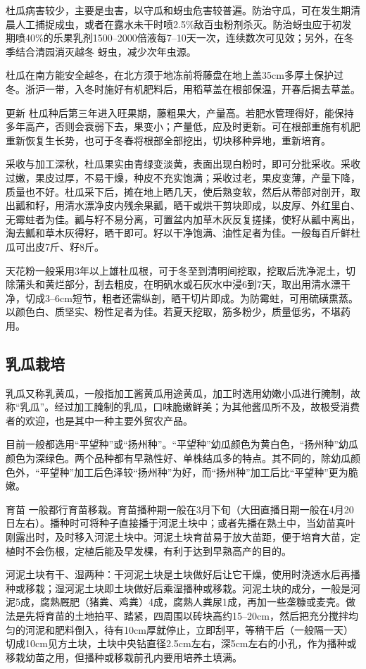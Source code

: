 \documentclass{ctexbook}
\begin{document}
杜瓜病害较少，主要是虫害，以守瓜和蚜虫危害较普遍。防治守瓜，可在发生期清晨人工捕捉成虫，或者在露水未干时喷2.5\%敌百虫粉剂杀灭。防治蚜虫应于初发期喷40\%的乐果乳剂1500--2000倍液每7--10天一次，连续数次可见效；另外，在冬季结合清园消灭越冬
蚜虫，减少次年虫源。

杜瓜在南方能安全越冬，在北方须于地冻前将藤盘在地上盖35cm多厚土保护过冬。浙沪一带，入冬时施好有机肥料后，用稻草盖在根部保温，开春后揭去草盖。

更新 杜瓜种后第三年进入旺果期，藤粗果大，产量高。若肥水管理得好，能保持多年高产，否则会衰弱下去，果变小；产量低，应及时更新。可在根部重施有机肥重新恢复生长势，也可于冬春将根部全部挖出，切块移种异地，重新培育。

采收与加工深秋，杜瓜果实由青绿变淡黄，表面出现白粉时，即可分批采收。采收过嫩，果皮过厚，不易干燥，种皮不充实饱满；采收过老，果皮变薄，产量下降，质量也不好。杜瓜采下后，摊在地上晒几天，使后熟变软，然后从蒂部对剖开，取出瓤和籽，用清水漂净皮内残余果瓤，晒干或烘干剪块即成，以皮厚、外红里白、无霉蛀者为佳。瓤与籽不易分离，可置盆内加草木灰反复搓揉，使籽从瓤中离出，淘去瓤和草木灰得籽，晒干即可。籽以干净饱满、油性足者为佳。一般每百斤鲜杜瓜可出皮7斤、籽8斤。

天花粉一般采用3年以上雄杜瓜根，可于冬至到清明间挖取，挖取后洗净泥土，切除蒲头和黄烂部分，刮去粗皮，在明矾水或石灰水中浸6到7天，取出用清水漂干净，切成3--6cm短节，粗者还需纵剖，晒干切片即成。为防霉蛀，可用硫磺熏蒸。以颜色白、质坚实、粉性足者为佳。若夏天挖取，筋多粉少，质量低劣，不堪药用。
\subsection{乳瓜栽培}
乳瓜又称乳黄瓜，一般指加工酱黄瓜用途黄瓜，加工时选用幼嫩小瓜进行腌制，故称“乳瓜”。经过加工腌制的乳瓜，口味脆嫩鲜美；为其他酱瓜所不及，故极受消费者的欢迎，也是其中一种主要外贸农产品。

目前一般都选用“平望种”或“扬州种”。“平望种”幼瓜颜色为黄白色，“扬州种”幼瓜颜色为深绿色。两个品种都有早熟性好、单株结瓜多的特点。其不同的，除幼瓜颜色外，“平望种”加工后色泽较“扬州种”为好，而“扬州种”加工后比“平望种”更为脆嫩。

育苗 一般都行育苗移栽。育苗播种期一般在3月下旬（大田直播日期一般在4月20日左右）。播种时可将种子直接播于河泥土块中；或者先播在熟土中，当幼苗真叶刚露出时，及时移入河泥土块中。河泥土块育苗易于放大苗距，便于培育大苗，定植时不会伤根，定植后能及早发棵，有利于达到早熟高产的目的。

河泥土块有干、湿两种：干河泥土块是土块做好后让它干燥，使用时浇透水后再播种或移栽；湿河泥土块即土块做好后乘湿播种或移栽。河泥土块的成分，一般是河泥5成，腐熟厩肥（猪粪、鸡粪）4成，腐熟人粪尿1成，再加一些垄糠或麦壳。做法是先将育苗的土地拍平、踏紧，四周围以砖块高约15--20cm，然后把充分搅拌均匀的河泥和肥料倒入，待有10cm厚就停止，立即刮平，等稍干后（一般隔一天）切成10cm见方土块，土块中央钻直径2.5cm左右，深5cm左右的小孔，作为播种或移栽幼苗之用，但播种或移栽前孔内要用培养土填满。
\end{document}
